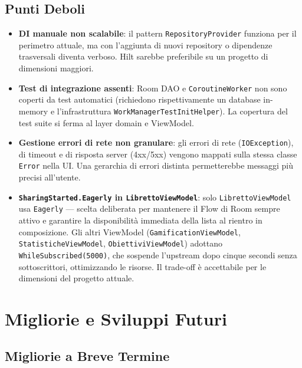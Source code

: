 \documentclass[a4paper,12pt]{report}
\begin{document}
    \section{Punti Deboli}

    \begin{itemize}
        \item \textbf{DI manuale non scalabile}: il pattern \texttt{RepositoryProvider}
        funziona per il perimetro attuale, ma con l'aggiunta di nuovi repository o
        dipendenze trasversali diventa verboso. Hilt sarebbe preferibile su un progetto
        di dimensioni maggiori.

        \item \textbf{Test di integrazione assenti}: Room DAO e \texttt{CoroutineWorker}
        non sono coperti da test automatici (richiedono rispettivamente un database
        in-memory e l'infrastruttura \texttt{WorkManagerTestInitHelper}). La copertura
        del test suite si ferma al layer domain e ViewModel.

        \item \textbf{Gestione errori di rete non granulare}: gli errori di rete
        (\texttt{IOException}), di timeout e di risposta server (4xx/5xx) vengono mappati
        sulla stessa classe \texttt{Error} nella UI. Una gerarchia di errori distinta
        permetterebbe messaggi più precisi all'utente.

        \item \textbf{\texttt{SharingStarted.Eagerly} in \texttt{LibrettoViewModel}}:
        solo \texttt{LibrettoViewModel} usa \texttt{Eagerly} --- scelta deliberata per
        mantenere il Flow di Room sempre attivo e garantire la disponibilità immediata
        della lista al rientro in composizione. Gli altri ViewModel
        (\texttt{GamificationViewModel}, \texttt{StatisticheViewModel},
        \texttt{ObiettiviViewModel}) adottano \texttt{WhileSubscribed(5000)}, che
        sospende l'upstream dopo cinque secondi senza sottoscrittori, ottimizzando
        le risorse. Il trade-off è accettabile per le dimensioni del progetto attuale.
    \end{itemize}

    \chapter{Migliorie e Sviluppi Futuri}

    \section{Migliorie a Breve Termine}
\end{document}
